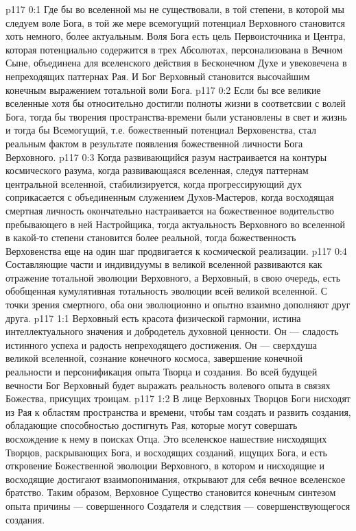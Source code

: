 \author{Могучий Вестник}
\vs p117 0:1 Где бы во вселенной мы не существовали, в той степени, в которой мы следуем воле Бога, в той же мере всемогущий потенциал Верховного становится хоть немного, более актуальным. Воля Бога есть цель Первоисточника и Центра, которая потенциально содержится в трех Абсолютах, персонализована в Вечном Сыне, объединена для вселенского действия в Бесконечном Духе и увековечена в непреходящих паттернах Рая. И Бог Верховный становится высочайшим конечным выражением тотальной воли Бога.
\vs p117 0:2 Если бы все великие вселенные хотя бы относительно достигли полноты жизни в соответсвии с волей Бога, тогда бы творения пространства\hyp{}времени были установлены в свет и жизнь и тогда бы Всемогущий, т.е. божественный потенциал Верховенства, стал реальным фактом в результате появления божественной личности Бога Верховного.
\vs p117 0:3 Когда развивающийся разум настраивается на контуры космического разума, когда развивающаяся вселенная, следуя паттернам центральной вселенной, стабилизируется, когда прогрессирующий дух соприкасается с объединенным служением Духов\hyp{}Мастеров, когда восходящая смертная личность окончательно настраивается на божественное водительство пребывающего в ней Настройщика, тогда актуальность Верховного во вселенной в какой\hyp{}то степени становится более реальной, тогда божественность Верховенства еще на один шаг продвигается к космической реализации.
\vs p117 0:4 Составляющие части и индивидуумы в великой вселенной развиваются как отражение тотальной эволюции Верховного, а Верховный, в свою очередь, есть обобщенная кумулятивная тотальность эволюции всей великой вселенной. С точки зрения смертного, оба они эволюционно и опытно взаимно дополняют друг друга.
\vs p117 1:1 Верховный есть красота физической гармонии, истина интеллектуального значения и добродетель духовной ценности. Он --- сладость истинного успеха и радость непреходящего достижения. Он --- сверхдуша великой вселенной, сознание конечного космоса, завершение конечной реальности и персонификация опыта Творца и создания. Во всей будущей вечности Бог Верховный будет выражать реальность волевого опыта в связях Божества, присущих троицам.
\vs p117 1:2 \pc В лице Верховных Творцов Боги нисходят из Рая к областям пространства и времени, чтобы там создать и развить создания, обладающие способностью достигнуть Рая, которые могут совершать восхождение к нему в поисках Отца. Это вселенское нашествие нисходящих Творцов, раскрывающих Бога, и восходящих созданий, ищущих Бога, и есть откровение Божественной эволюции Верховного, в котором и нисходящие и восходящие достигают взаимопонимания, открывают для себя вечное вселенское братство. Таким образом, Верховное Существо становится конечным синтезом опыта причины --- совершенного Создателя и следствия --- совершенствующегося создания.
